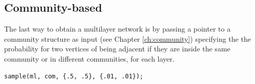 \subsection{Community-based}

The last way to obtain a multilayer network is by passing a pointer to a community structure as input (see Chapter \ref{ch:community}) specifying the the probability for two vertices of being adjacent if they are inside the same community or in different communities, for each layer. 
\begin{lstlisting}[style=c++]
sample(ml, com, {.5, .5}, {.01, .01});
\end{lstlisting}